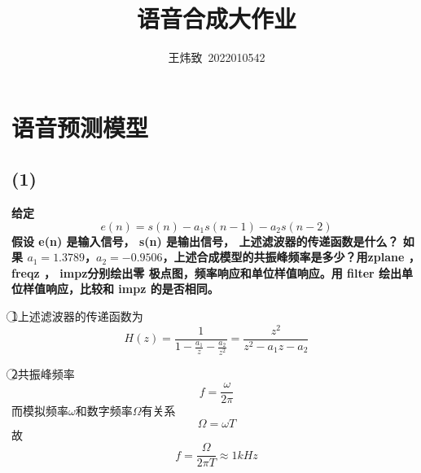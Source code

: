 \documentclass[10pt]{article}
\title{语音合成大作业}
\author{王炜致\ 2022010542}
\date{}
\begin{document}
\maketitle
\section{语音预测模型}
\subsection*{(1)}
\textbf{\color{gray}
给定$$e(n) = s(n) - a_1s(n - 1) - a_2s(n - 2)$$
假设 e(n) 是输入信号， s(n) 是输出信号， 上述滤波器的传递函数是什么？ 如果 $a_1 = 1.3789
$，$a_2 = -0.9506$，上述合成模型的共振峰频率是多少？用zplane ， freqz ， impz分别绘出零
极点图，频率响应和单位样值响应。用 filter 绘出单位样值响应，比较和 impz 的是否相同。}

\textcircled{1}上述滤波器的传递函数为$$H(z)=\frac{1}{1-\frac{a_1}{z}-\frac{a_2}{z^2}} 
=\frac{z^2}{z^2-a_1z-a_2}$$

\textcircled{2}共振峰频率$$f=\frac{\omega}{2\pi}$$
而模拟频率$\omega$和数字频率$\Omega$有关系$$\Omega=\omega T$$
故$$f=\frac{\Omega}{2\pi T}\approx1kHz$$
\end{document}
